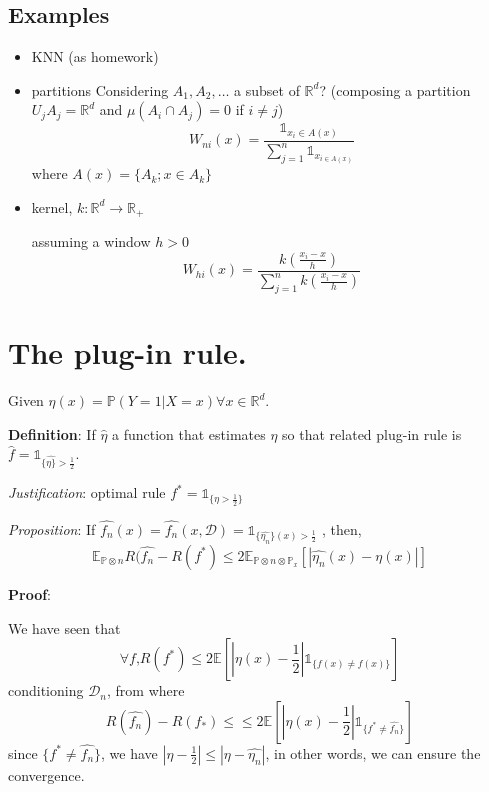 		\subsection{Examples} 
					\begin{itemize}
						\item KNN (as homework)
						\item partitions
							Considering $A_1,A_2,\dots$ a subset of $\mathbb{R}^d$? (composing a partition $U_j A_j=\mathbb{R}^d$ and $\mu(A_i\cap A_j)=0$ if $i\neq j$)
							\[
							  W_{ni}(x)=\frac{\mathds{1}_{x_i\in A(x)}}{\sum_{j=1}^{n} \mathds{1}_{x_{i\in A(x)}}}
							\]
							where $A(x)=\{A_k;x\in A_k\}$

							
						\item kernel, $k:\mathbb{R}^d\rightarrow\mathbb{R}_+$ 

							assuming a window $h>0$
							\[
							  W_{hi}(x)=\frac{k(\frac{x_i-x}{h})}{\sum_{j=1}^{n} k(\frac{x_i-x}{h})}
							\]

							
					\end{itemize}


	\section{The plug-in rule.}

		Given $\eta(x)=\mathbb{P}(Y=1|X=x) \forall x \in \mathbb{R}^d$.

		\textbf{Definition}:  If $\hat{\eta}$ a function that estimates $\eta$ so that related plug-in rule is $\hat{f} = \mathds{1}_{\{\hat{\eta\}}> \frac{1}{2}}$.

		\emph{Justification}: optimal rule $f^* = \mathds{1}_{\{\eta> \frac{1}{2}\}}$  

		\emph{Proposition}: If $\hat{f_n}(x) = \hat{f_n}(x,\mathcal{D}) = \mathds{1}_{\{\hat{{\eta}_n}\}(x)>\frac{1}{2}}$ , then,
		\[
			\mathbb{E}_{\mathbb{P}\otimes n}R(\hat{f_n} - R({f^*}) \leq 2\mathbb{E}_{\mathbb{P}\otimes n\otimes\mathbb{P}_x}[|\hat{{\eta}_n}(x) - {\eta}(x)|]
		\]

		\textbf{Proof}:

		We have seen that 
		\[
			\forall f\text{,} R(f^*) \leq 2\mathbb{E}[|\eta(x)-\frac{1}{2}|\mathds{1}_{\{f(x)\neq f(x)\}}]
		\]
		conditioning $\mathcal{D}_n$, from where
		\[
			R(\hat{f_n}) - R({f_*}) \leq \leq 2\mathbb{E}[|\eta(x)-\frac{1}{2}|\mathds{1}_{\{f^*\neq \hat{f_n}\}}]
		\]
		since $\{f^*\neq \hat{f_n}\}$, we have $|\eta - \frac{1}{2}|\leq|\eta - \hat{{\eta}_n}|$, in other words, we can ensure the convergence.

